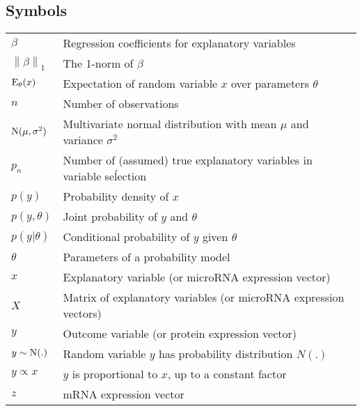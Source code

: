\documentclass[english,12pt,a4paper,pdftex,elec,utf8]{aaltothesis}
\begin{document}
\subsection*{Symbols}

\begin{tabular}{ll}
$\beta$                    & Regression coefficients for explanatory variables \\
$\left\| \beta \right\|_1$ & The 1-norm of $\beta$ \\
$\textup{E}_{\theta}(x)$   & Expectation of random variable $x$ over parameters $\theta$ \\
$n$                        & Number of observations \\
$\textup{N}(\mu,\sigma^2)$ & Multivariate normal distribution with mean $\mu$ and variance $\sigma^2$ \\
$p_n$                      & Number of (assumed) true explanatory variables in variable seĺection \\
$p(y)$                     & Probability density of $x$ \\
$p(y,\theta)$              & Joint probability of $y$ and $\theta$ \\
$p(y|\theta)$              & Conditional probability of $y$ given $\theta$ \\
$\theta$                   & Parameters of a probability model \\
$x$                        & Explanatory variable (or microRNA expression vector) \\
$X$                        & Matrix of explanatory variables (or microRNA expression vectors) \\
$y$                        & Outcome variable (or protein expression vector) \\
$y \sim \textup{N}(.)$     & Random variable $y$ has probability distribution $N(.)$ \\
$y \propto x$              & $y$ is proportional to $x$, up to a constant factor \\
$z$                        & mRNA expression vector
\end{tabular}

\end{document}
